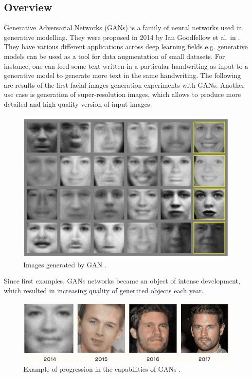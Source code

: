 \documentclass[12pt,a4paper,openany]{book}
\begin{document}
\subsection{Overview}

\noindent Generative Adversarial Networks (GANs) is a family of neural networks used in generative modelling. They were proposed in 2014 by Ian Goodfellow et al. in \cite{gan}.\\
\noindent They have various different applications across deep learning fields e.g. generative models can be used as a tool for data augmentation of small datasets. For instance, one can feed some text written in a particular handwriting as input to a generative model to generate more text in the same handwriting. The following are results of the first facial images generation experiments with GANs. Another use case is generation of super-resolution images, which allows to produce more detailed and high quality version of input images. 
 \begin{figure}[ht!]
     \centering
     \includegraphics[scale=0.4]{figs/faces.png}
     \caption{Images generated by GAN \cite{gan}.}
 \end{figure}
 \newpage
\noindent Since first examples, GANs networks became an object of intense development, which resulted in increasing quality of generated objects each year.
 \begin{figure}[ht!]
     \centering
     \includegraphics[scale=0.5]{figs/gan_progression.png}
     \caption{Example of progression in the capabilities of GANs \cite{ganprogress}. }
 \end{figure}
 \newline
\end{document}
